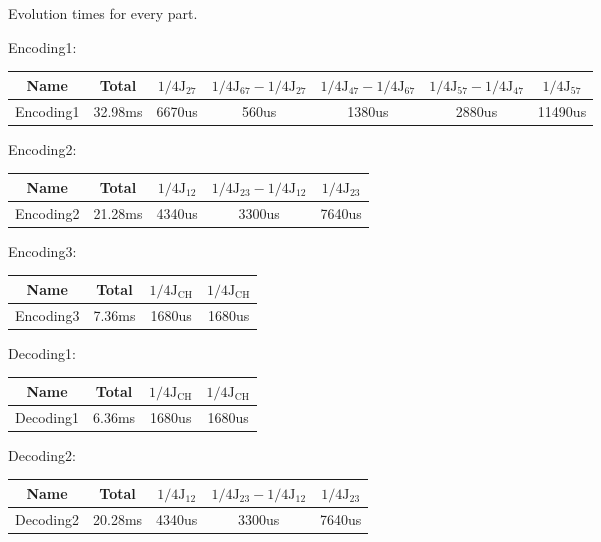 Evolution times for every part.

Encoding1:
\begin{table}[hbtp]
\begin{tabular} {c||c|c|c|c|c|c}
  \hline
   Name & Total & $1/4\text{J}_{27}$ & $1/4\text{J}_{67}-1/4\text{J}_{27}$ & $1/4\text{J}_{47}-1/4\text{J}_{67}$ & $1/4\text{J}_{57}-1/4\text{J}_{47}$ & $1/4\text{J}_{57}$\\
  \hline
  Encoding1 & 32.98ms & 6670us & 560us & 1380us & 2880us & 11490us\\
  \hline
\end{tabular}
\end{table}

Encoding2:
\begin{table}[hbtp]
\begin{tabular} {c||c|c|c|c}
  \hline
   Name & Total & $1/4\text{J}_{12}$ & $1/4\text{J}_{23}-1/4\text{J}_{12}$ & $1/4\text{J}_{23}$\\
  \hline
  Encoding2 & 21.28ms & 4340us & 3300us & 7640us\\
  \hline
\end{tabular}
\end{table}

Encoding3:
\begin{table}[hbtp]
\begin{tabular} {c||c|c|c}
  \hline
   Name & Total & $1/4\text{J}_{\text{CH}}$ & $1/4\text{J}_{\text{CH}}$\\
  \hline
  Encoding3 & 7.36ms & 1680us & 1680us\\
  \hline
\end{tabular}
\end{table}

Decoding1:
\begin{table}[!h]
\begin{tabular} {c||c|c|c}
  \hline
   Name & Total & $1/4\text{J}_{\text{CH}}$ & $1/4\text{J}_{\text{CH}}$\\
  \hline
  Decoding1 & 6.36ms & 1680us & 1680us\\
  \hline
\end{tabular}
\end{table}

Decoding2:
\begin{table}[!h]
\begin{tabular} {c||c|c|c|c}
  \hline
   Name & Total & $1/4\text{J}_{12}$ & $1/4\text{J}_{23}-1/4\text{J}_{12}$ & $1/4\text{J}_{23}$\\
  \hline
 Decoding2 & 20.28ms & 4340us & 3300us & 7640us\\
  \hline
\end{tabular}
\end{table}

